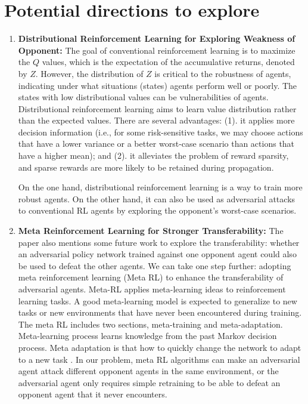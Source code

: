 \documentclass[a4paper]{article}
\begin{document}
\section{Potential directions to explore}
\begin{enumerate}
    \item \textbf{Distributional Reinforcement Learning for Exploring Weakness of Opponent:} 
    The goal of conventional reinforcement learning is to maximize the $Q$ values, which is the expectation of the accumulative returns, denoted by $Z$. However, the distribution of $Z$ is critical to the robustness of agents, indicating under what situations (states) agents perform well or poorly. The states with low distributional values can be vulnerabilities of agents. Distributional reinforcement learning \cite{bellemare_distributional_2017} aims to learn value distribution rather than the expected values. There are several advantages: (1). it applies more decision information (i.e., for some risk-sensitive tasks, we may choose actions that have a lower variance or a better worst-case scenario than actions that have a higher mean); and (2). it alleviates the problem of reward sparsity, and sparse rewards are more likely to be retained during propagation. 

    On the one hand, distributional reinforcement learning is a way to train more robust agents. On the other hand, it can also be used as adversarial attacks to conventional RL agents by exploring the opponent's worst-case scenarios.

    \item \textbf{Meta Reinforcement Learning for Stronger Transferability: } 
    The paper also mentions some future work to explore the transferability: whether an adversarial policy network trained against one opponent agent could also be used to defeat the other agents. We can take one step further: adopting meta reinforcement learning (Meta RL) to enhance the transferability of adversarial agents. Meta-RL applies meta-learning ideas to reinforcement learning tasks. A good meta-learning model is expected to generalize to new tasks or new environments that have never been encountered during training. The meta RL includes two sections, meta-training and meta-adaptation. Meta-learning process learns knowledge from the past Markov decision process. Meta adaptation is that how to quickly change the network to adapt to a new task \cite{wang2016learning}. In our problem, meta RL algorithms can make an adversarial agent attack different opponent agents in the same environment, or the adversarial agent only requires simple retraining to be able to defeat an opponent agent that it never encounters.
    

\end{enumerate}
\end{document}
